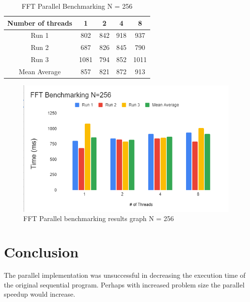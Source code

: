 \begin{table}[htbp]
      \centering
      \begin{tabular}{|c|c|c|c|c|}
\hline
\textbf{Number of threads} & \textbf{1} & \textbf{2} & \textbf{4} & \textbf{8} \\
\hline
Run 1 & 802 &842	&918	&937 \\
\hline
Run 2 & 687 &826	&845	&790 \\
\hline
Run 3 & 1081    &794	&852	&1011 \\
\hline
Mean Average &  857 &821	&872	&913 \\
\hline
      \end{tabular}
      \caption{FFT Parallel Benchmarking N = 256}
      \label{tab:minLab-256}
    \end{table}  
\begin{figure}[H] 
    \centering
    \includegraphics[width=0.9\columnwidth]{Figures/Report/graph 256.png}
    \caption{FFT Parallel benchmarking results graph N = 256 }
    \label{fig:miniLab-graph-256}
\end{figure}
   


\section{Conclusion}
The parallel implementation was unsuccessful in decreasing the execution time of the original sequential program. Perhaps with increased problem size the parallel speedup would increase. 
